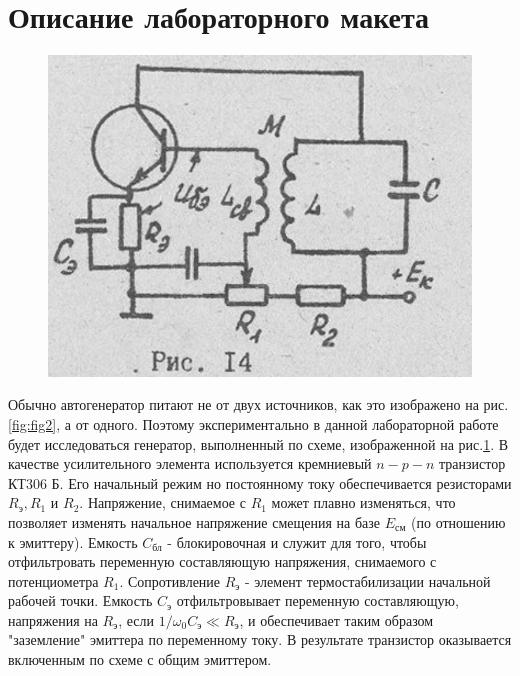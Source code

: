\section{Описание лабораторного макета}

\begin{figure}
\includegraphics[width=\linewidth]{circuit/14.jpg}
\caption{}
\label{fig:fig14}
\vspace{-17pt}
\end{figure}

Обычно автогенератор питают не от двух источников, как это изображено на рис.\ref{fig:fig2}, а от одного. Поэтому экспериментально в данной лабораторной работе будет исследоваться генератор, выполненный по схеме, изображенной на рис.\ref{fig:fig14}. В качестве усилительного элемента используется кремниевый $n-p-n$ транзистор КТ306 Б. Его начальный режим но постоянному току обеспечивается резисторами $R_\text{э}, R_1$ и $R_2$. Напряжение, снимаемое с $R_1$ может плавно изменяться, что позволяет изменять начальное напряжение смещения на базе $E_\text{см}$ (по отношению к эмиттеру). Емкость $C_\text{бл}$	- блокировочная и служит для того, чтобы отфильтровать переменную составляющую напряжения, снимаемого с потенциометра $R_1$. Сопротивление $R_\text{э}$ - элемент термостабилизации начальной рабочей точки. Емкость $C_\text{э}$ отфильтровывает переменную составляющую, напряжения на $R_\text{э}$, если $1/\omega_0 C_\text{э}\ll R_\text{э}$, и обеспечивает таким образом "заземление" эмиттера по переменному току. В результате транзистор оказывается включенным по схеме с общим эмиттером.

